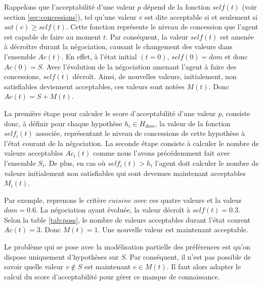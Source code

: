 		Rappelons que l'acceptabilité d'une valeur $p$ dépend de la fonction $self(t)$ (voir section \ref{sec:concessions}), tel qu'une valeur $v$ est dite acceptable si et seulement si $sat(v) \geq self(t)$. Cette fonction représente le niveau de concession que l'agent est capable de faire au moment $t$. Par conséquent, la valeur $self(t)$ est amenée à décroître durant la négociation, causant le changement des valeurs dans l'ensemble $Ac(t)$. En effet, à l'état initial $(t=0)$, $self(0) = dom$ et donc $Ac(0) = S$. Avec l'évolution de la négociation amenant l'agent à faire des concessions, $self(t)$ décroît. Ainsi, de nouvelles valeurs, initialement, non satisfiables deviennent acceptables, ces valeurs sont notées $M(t)$. Donc $ Ac(t) = S + M(t)$.
		
		La première étape pour calculer le score d'acceptabilité d'une valeur $p$, consiste donc, à définir pour chaque hypothèse $h_i \in H_{dom}$, la valeur de la fonction $self_i(t)$ associée, représentant le niveau de concessions de cette hypothèse à l'état courant de la négociation. 
		La seconde étape consiste à calculer le nombre de valeurs acceptables $Ac_i(t)$ comme nous l'avons précédemment fait avec l'ensemble $S_i$. De plus, en cas  où $self_i(t) > h_i$ l'agent doit calculer le nombre de valeurs initialement non satisfiables qui sont devenues maintenant acceptables $M_i(t)$.
		
		Par exemple, reprenons le critère $cuisine$ avec ces quatre valeurs et la valeur $dom=0.6$. La négociation ayant évoluée, la valeur décroît à $self(t) = 0.3$. 
		Selon la table \ref{tab:poss}, le nombre de valeurs acceptables durant l'état courent $Ac(t) = 3$. Donc $M(t) =1$. Une nouvelle valeur est maintenant acceptable. 
		
		Le problème qui se pose avec la modélisation partielle des préférences est qu'on dispose uniquement d'hypothèses sur $S$. Par conséquent, il n'est pas possible de savoir quelle valeur $v \not \in S$ est maintenant $v \in M(t)$. Il faut alors adapter le calcul du score d'acceptabilité pour gérer ce manque de connaissance.
		
